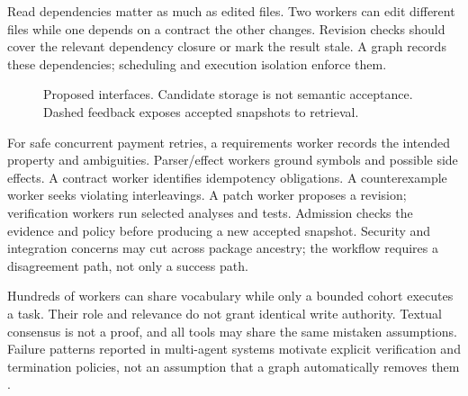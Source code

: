 \documentclass[11pt]{article}
\begin{document}
Read dependencies matter as much as edited files. Two workers can edit different files while one depends on a contract the other changes. Revision checks should cover the relevant dependency closure or mark the result stale. A graph records these dependencies; scheduling and execution isolation enforce them.

\begin{figure}[ht]\centering
{}\caption{Proposed interfaces. Candidate storage is not semantic acceptance. Dashed feedback exposes accepted snapshots to retrieval.}\end{figure}

For safe concurrent payment retries, a requirements worker records the intended property and ambiguities. Parser/effect workers ground symbols and possible side effects. A contract worker identifies idempotency obligations. A counterexample worker seeks violating interleavings. A patch worker proposes a revision; verification workers run selected analyses and tests. Admission checks the evidence and policy before producing a new accepted snapshot. Security and integration concerns may cut across package ancestry; the workflow requires a disagreement path, not only a success path.

Hundreds of workers can share vocabulary while only a bounded cohort executes a task. Their role and relevance do not grant identical write authority. Textual consensus is not a proof, and all tools may share the same mistaken assumptions. Failure patterns reported in multi-agent systems motivate explicit verification and termination policies, not an assumption that a graph automatically removes them \citep{mast2025}.
\end{document}
